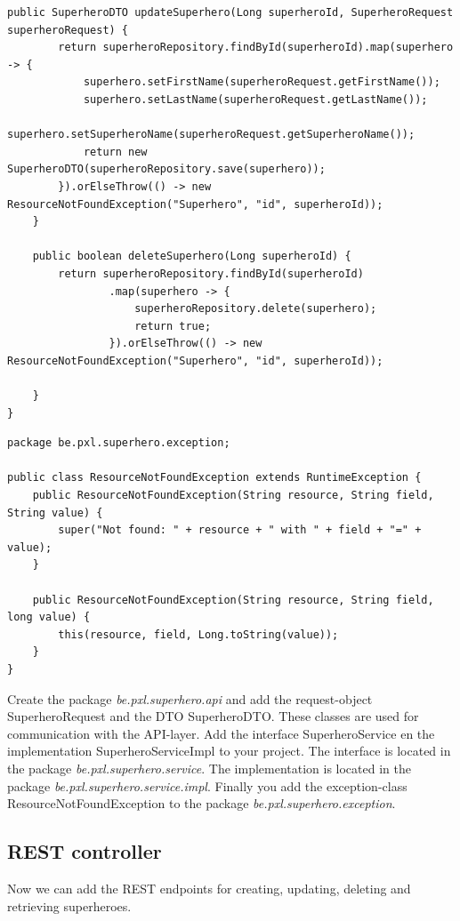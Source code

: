 \begin{lstlisting}[frame=single]
	public SuperheroDTO updateSuperhero(Long superheroId, SuperheroRequest superheroRequest) {
		return superheroRepository.findById(superheroId).map(superhero -> {
			superhero.setFirstName(superheroRequest.getFirstName());
			superhero.setLastName(superheroRequest.getLastName());
			superhero.setSuperheroName(superheroRequest.getSuperheroName());
			return new SuperheroDTO(superheroRepository.save(superhero));
		}).orElseThrow(() -> new ResourceNotFoundException("Superhero", "id", superheroId));
	}

	public boolean deleteSuperhero(Long superheroId) {
		return superheroRepository.findById(superheroId)
				.map(superhero -> {
					superheroRepository.delete(superhero);
					return true;
				}).orElseThrow(() -> new ResourceNotFoundException("Superhero", "id", superheroId));

	}
}
\end{lstlisting}

\begin{lstlisting}
package be.pxl.superhero.exception;

public class ResourceNotFoundException extends RuntimeException {
    public ResourceNotFoundException(String resource, String field, String value) {
        super("Not found: " + resource + " with " + field + "=" + value);
    }

    public ResourceNotFoundException(String resource, String field, long value) {
        this(resource, field, Long.toString(value));
    }
}
\end{lstlisting}

\begin{oefening}
Create the package \textit{be.pxl.superhero.api} and add the request-object SuperheroRequest and the DTO SuperheroDTO.  These classes are used for communication with the API-layer. 
Add the interface SuperheroService en the implementation SuperheroServiceImpl to your project. The interface is located in the package \textit{be.pxl.superhero.service}. The implementation is located in the package \textit{be.pxl.superhero.service.impl}. Finally you add the exception-class  ResourceNotFoundException to the package \textit{be.pxl.superhero.exception}.
\end{oefening}

\subsection{REST controller}

Now we can add the REST endpoints for creating, updating, deleting and retrieving superheroes. 

